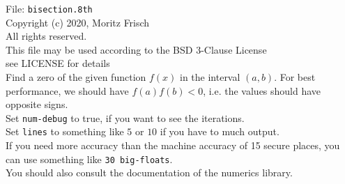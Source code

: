 \documentclass{article}
\begin{document}
 
File: \texttt{bisection.8th} \\
Copyright (c) 2020, Moritz Frisch\\
All rights reserved.\\
This file may be used according to the BSD 3-Clause License\\
see LICENSE for details\\
 
Find a zero of the given function $f(x)$ in the interval $(a,b)$.
For best performance, we should have $f(a) f(b) < 0$, i.e. the
values should have opposite signs.\\
 
Set \texttt{num-debug} to true, if you want to see the iterations.\\
 
Set \texttt{lines} to something like $5$ or $10$ if you have to much
output. \\
 
If you need more accuracy than the machine accuracy of 15 secure places, 
you can use something like \texttt{30 big-floats}. \\
 
You should also consult the documentation of the numerics library.
 
\end{document}
